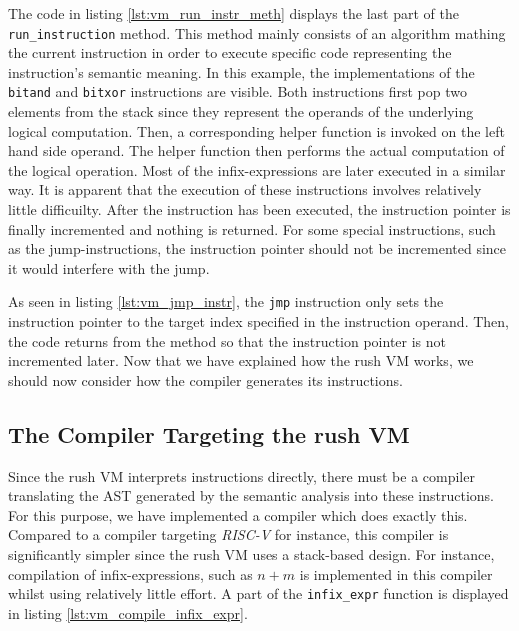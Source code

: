 
The code in listing \ref{lst:vm_run_instr_meth} displays the last part of the \texttt{run\_instruction} method.
This method mainly consists of an algorithm mathing the current instruction in order to execute specific code representing the instruction's semantic meaning.
In this example, the implementations of the \texttt{bitand} and \texttt{bitxor} instructions are visible.
Both instructions first pop two elements from the stack since they represent the operands of the underlying logical computation.
Then, a corresponding helper function is invoked on the left hand side operand.
The helper function then performs the actual computation of the logical operation.
Most of the infix-expressions are later executed in a similar way.
It is apparent that the execution of these instructions involves relatively little difficuilty.
After the instruction has been executed, the instruction pointer is finally incremented and nothing is returned.
For some special instructions, such as the jump-instructions, the instruction pointer should not be incremented since it would interfere with the jump.


As seen in listing \ref{lst:vm_jmp_instr}, the \texttt{jmp} instruction only sets the instruction pointer to the target index specified in the instruction operand.
Then, the code returns from the method so that the instruction pointer is not incremented later.
Now that we have explained how the rush VM works, we should now consider how the compiler generates its instructions.

\subsection{The Compiler Targeting the rush VM}

Since the rush VM interprets instructions directly, there must be a compiler translating the AST generated by the semantic analysis into these instructions.
For this purpose, we have implemented a compiler which does exactly this.
Compared to a compiler targeting \emph{RISC-V} for instance, this compiler is significantly simpler since the rush VM uses a stack-based design.
For instance, compilation of infix-expressions, such as $n + m$ is implemented in this compiler whilst using relatively little effort.
A part of the \texttt{infix\_expr} function is displayed in listing \ref{lst:vm_compile_infix_expr}.

